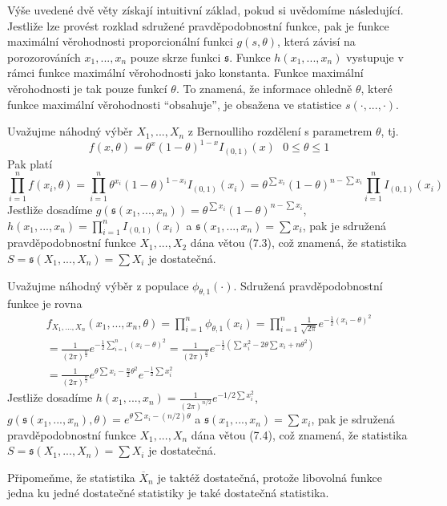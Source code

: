 Výše uvedené dvě věty získají intuitivní základ, pokud si uvědomíme následující. Jestliže lze provést rozklad sdružené pravděpodobnostní funkce, pak je funkce maximální věrohodnosti proporcionální funkci $g(s, \theta)$, která závisí na porozorováních $x_1, ..., x_n$ pouze skrze funkci $\mathfrak{s}$. Funkce $h(x_1, ..., x_n)$ vystupuje v rámci funkce maximální věrohodnosti jako konstanta. Funkce maximální věrohodnosti je tak pouze funkcí $\theta$. To znamená, že informace ohledně $\theta$, které funkce maximální věrohodnosti ``obsahuje'', je obsažena ve statistice $s(\cdot, ..., \cdot)$. 

\begin{example}
Uvažujme náhodný výběr $X_1, ..., X_n$ z Bernoulliho rozdělení s parametrem $\theta$, tj.
\begin{equation*}
f(x, \theta) = \theta^x (1 - \theta)^{1-x}I_{(0,1)}(x) ~~~ 0 \le \theta \le 1
\end{equation*}
Pak platí
\begin{equation*}
\prod_{i = 1}^n f(x_i, \theta) = \prod_{i = 1}^n \theta^{x_i}(1 - \theta)^{1 - x_i}I_{(0,1)}(x_i) = \theta^{\sum x_i}(1 - \theta)^{n - \sum x_i}\prod_{i = 1}^n I_{(0, 1)}(x_i)
\end{equation*}
Jestliže dosadíme $g(\mathfrak{s}(x_1, ..., x_n)) = \theta^{\sum x_i}(1 - \theta)^{n - \sum x_i}$, $h(x_1, ..., x_n) = \prod_{i = 1}^n I_{(0,1)}(x_i)$ a $\mathfrak{s}(x_1, ..., x_n) = \sum x_i$, pak je sdružená pravděpodobnostní funkce $X_1, ..., X_2$ dána větou (7.3), což znamená, že statistika $S = \mathfrak{s}(X_1, ..., X_n) = \sum X_i$ je dostatečná.
\end{example}

\begin{example}
Uvažujme náhodný výběr z populace $\phi_{\theta, 1}(\cdot)$. Sdružená pravděpodobnostní funkce je rovna
\begin{gather*}
f_{X_1, ..., X_n}(x_1, ..., x_n, \theta) = \prod_{i = 1}^n \phi_{\theta,1}(x_i) = \prod_{i = 1}^n \frac{1}{\sqrt{2 \pi}}e^{-\frac{1}{2}(x_i - \theta)^2}\\
= \frac{1}{(2 \pi)^{\frac{n}{2}}}e^{-\frac{1}{2}\sum_{i = 1}^n(x_i - \theta)^2} = \frac{1}{(2 \pi)^{\frac{n}{2}}}e^{-\frac{1}{2}(\sum x_i^2 - 2 \theta \sum x_i + n \theta^2)}\\
= \frac{1}{(2 \pi)^{\frac{n}{2}}}e^{\theta \sum x_i - \frac{n}{2}\theta^2}e^{-\frac{1}{2}\sum x_i^2}
\end{gather*}
Jestliže dosadíme $h(x_1, ..., x_n) = \frac{1}{(2 \pi)^{n/2}}e^{-1/2 \sum x_i^2}$, $g(\mathfrak{s}(x_1, ..., x_n), \theta) = e^{\theta \sum x_i - (n/2)\theta}$ a $\mathfrak{s}(x_1, ..., x_n) = \sum x_i$, pak je sdružená pravděpodobnostní funkce $X_1, ..., X_n$ dána větou (7.4), což znamená, že statistika $S = \mathfrak{s}(X_1, ..., X_n) = \sum X_i$ je dostatečná.

Připomeňme, že statistika $\overline{X}_n$ je taktéž dostatečná, protože libovolná funkce jedna ku jedné dostatečné statistiky je také dostatečná statistika. 
\end{example}

